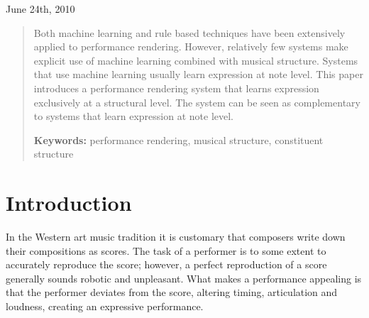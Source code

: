 \documentclass[a4paper,10pt]{article}
\begin{document}
\begin{titlepage}
\begin{center}
\vspace{1.5cm}

June 24th, 2010

\end{center}

\end{titlepage}



\begin{abstract}
Both machine learning and rule based techniques have been extensively applied to performance rendering. However, relatively few systems make explicit use of machine learning combined with musical structure. Systems that use machine learning usually learn expression at note level. This paper introduces a performance rendering system that learns expression exclusively at a structural level. The system can be seen as complementary to systems that learn expression at note level. 




{\bf Keywords:} performance rendering, musical structure, constituent structure
\end{abstract}
\section{Introduction}

In the Western art music tradition it is customary that composers write down their compositions as scores. The task of a performer is to some extent to accurately reproduce the score; however, a perfect reproduction of a score generally sounds robotic and unpleasant. What makes a performance appealing is that the performer deviates from the score, altering timing, articulation and loudness, creating an expressive performance.
\end{document}
